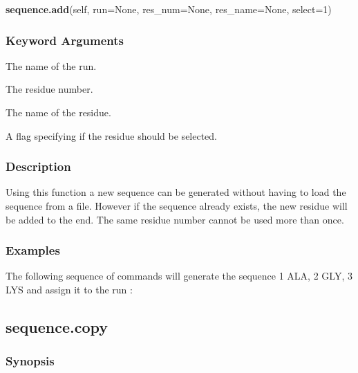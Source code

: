 \textsf{\textbf{sequence.add}(self, run=None, res\_num=None, res\_name=None, select=1)}


\subsubsection{Keyword Arguments}


  The name of the run.

  The residue number.

  The name of the residue.

  A flag specifying if the residue should be selected.

\subsubsection{Description}

Using this function a new sequence  can be generated without having to load the sequence  from
a file.  However if the sequence  already exists, the new residue will be added to the end.
The same residue number cannot be used more than once.


\subsubsection{Examples}

The following sequence  of commands will generate the sequence  1 ALA, 2 GLY, 3 LYS and assign
it to the run 
:







\newpage

\subsection{sequence.copy}


\subsubsection{Synopsis}

